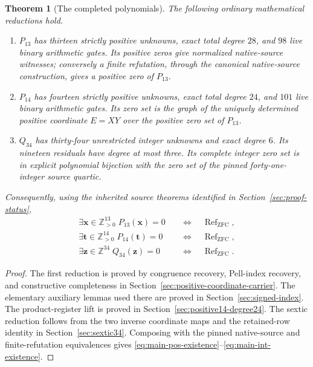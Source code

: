 \documentclass[11pt,a4paper]{article}
\newtheorem{theorem}{Theorem}[section]
\theoremstyle{definition}
\newcommand{\Z}{\mathbb Z}
\newcommand{\Zpos}{\mathbb Z_{>0}}
\newcommand{\ZFC}{\mathrm{ZFC}}
\newcommand{\ZFCRef}{\operatorname{Ref}}
\begin{document}
\begin{theorem}[The completed polynomials]
\label{thm:main}
The following ordinary mathematical reductions hold.
\begin{enumerate}
 \item \(P_{13}\) has thirteen strictly positive unknowns, exact total
 degree \(28\), and \(98\) live binary arithmetic gates.  Its positive
 zeros give normalized native-source witnesses; conversely a finite
 refutation, through the canonical native-source construction, gives a
 positive zero of \(P_{13}\).
 \item \(P_{14}\) has fourteen strictly positive unknowns, exact total
 degree \(24\), and \(101\) live binary arithmetic gates.  Its zero set
 is the graph of the uniquely determined positive coordinate \(E=XY\)
 over the positive zero set of \(P_{13}\).
 \item \(Q_{34}\) has thirty-four unrestricted integer unknowns and exact
 degree \(6\).  Its nineteen residuals have degree at most three.  Its
 complete integer zero set is in explicit polynomial bijection with
 the zero set of the pinned forty-one-integer source quartic.
\end{enumerate}
Consequently, using the inherited source theorems identified in
Section~\ref{sec:proof-status},
\begin{align}
 \exists\mathbf x\in\Zpos^{13}\;P_{13}(\mathbf x)=0
 &\quad\Longleftrightarrow\quad\ZFCRef_{\ZFC},
 \label{eq:main-pos-existence}\\
 \exists\mathbf t\in\Zpos^{14}\;P_{14}(\mathbf t)=0
 &\quad\Longleftrightarrow\quad\ZFCRef_{\ZFC},
 \label{eq:main14-existence}\\
 \exists\mathbf z\in\Z^{34}\;Q_{34}(\mathbf z)=0
 &\quad\Longleftrightarrow\quad\ZFCRef_{\ZFC}.
 \label{eq:main-int-existence}
\end{align}
\end{theorem}

\begin{proof}
The first reduction is proved by congruence recovery, Pell-index recovery,
and constructive completeness in
Section~\ref{sec:positive-coordinate-carrier}.  The elementary auxiliary
lemmas used there are proved in Section~\ref{sec:signed-index}.
The product-register lift is proved in
Section~\ref{sec:positive14-degree24}.
The sextic reduction follows from the two inverse coordinate maps and
the retained-row identity in Section~\ref{sec:sextic34}.  Composing with
the pinned native-source and finite-refutation equivalences gives
\eqref{eq:main-pos-existence}--\eqref{eq:main-int-existence}.
\end{proof}
\end{document}
